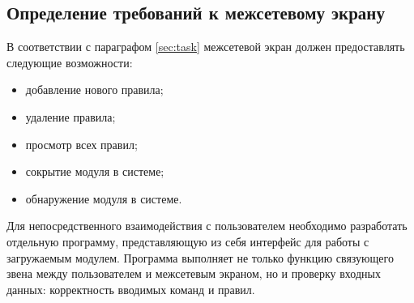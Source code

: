 \subsection{Определение требований к межсетевому экрану}
В соответствии с параграфом \ref{sec:task} межсетевой экран должен предоставлять следующие возможности:
\begin{itemize}
	\item добавление нового правила;

	\item удаление правила;
	
	\item просмотр всех правил;
	
	\item сокрытие модуля в системе;
	
	\item обнаружение модуля в системе. \\
\end{itemize}

Для непосредственного взаимодействия с пользователем необходимо разработать отдельную программу, представляющую из себя интерфейс для работы с загружаемым модулем. Программа выполняет не только функцию связующего звена между пользователем и межсетевым экраном, но и проверку входных данных: корректность вводимых команд и правил. \\


